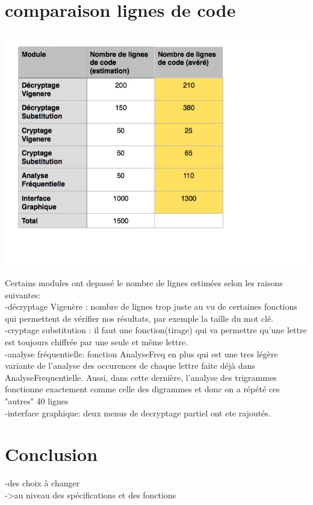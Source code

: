 \documentclass[a4]{article}
\begin{document}
	\section{comparaison lignes de code}
		\begin{center}\includegraphics[scale=0.5]{preview.jpg}\end{center}
		Certains modules ont depassé le nombre de lignes estimées selon les raisons suivantes: \\
		-décryptage Vigenère : nombre de lignes trop juste au vu de certaines fonctions qui permettent de vérifier
		 nos résultats, par exemple la taille du mot clé. \\
		-cryptage substitution : il faut une fonction(tirage) qui va permettre qu'une lettre est toujours chiffrée
		 par une seule et même lettre. \\
		-analyse fréquentielle: fonction AnalyseFreq en plus qui est une tres légère variante de l'analyse des occurences de 
		chaque lettre faite déjà dans AnalyseFrequentielle. Aussi, dans cette dernière, l'analyse des trigrammes fonctionne exactement
		comme celle des digrammes et donc on a répété ces "autres" 40 lignes \\
		-interface graphique: deux menus de decryptage partiel ont ete rajoutés.\\
		
	
	\section{Conclusion}
	-des choix à changer \\
	->au niveau des spécifications et des fonctions \\ \\
	
\end{document}
